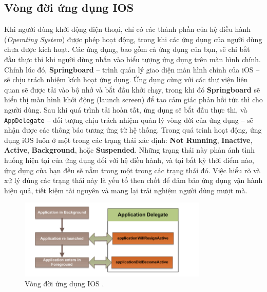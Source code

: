        
        \vspace{0.5em}
   \subsection{ Vòng đời ứng dụng IOS}	
        
            Khi người dùng khởi động điện thoại, chỉ có các thành phần của hệ điều hành (\textit{Operating System}) được phép hoạt động, trong khi các ứng dụng của người dùng chưa được kích hoạt. Các ứng dụng, bao gồm cả ứng dụng của bạn, sẽ chỉ bắt đầu thực thi khi người dùng nhấn vào biểu tượng ứng dụng trên màn hình chính. Chính lúc đó, \textbf{Springboard} – trình quản lý giao diện màn hình chính của iOS – sẽ chịu trách nhiệm kích hoạt ứng dụng. Ứng dụng cùng với các thư viện liên quan sẽ được tải vào bộ nhớ và bắt đầu khởi chạy, trong khi đó \textbf{Springboard} sẽ hiển thị màn hình khởi động (launch screen) để tạo cảm giác phản hồi tức thì cho người dùng. Sau khi quá trình tải hoàn tất, ứng dụng sẽ bắt đầu thực thi, và \texttt{AppDelegate} – đối tượng chịu trách nhiệm quản lý vòng đời của ứng dụng 
            – sẽ nhận được các thông báo tương ứng từ hệ thống.
            Trong quá trình hoạt động, ứng dụng iOS luôn ở một trong các trạng thái xác định: \textbf{Not Running}, \textbf{Inactive}, \textbf{Active}, \textbf{Background}, hoặc \textbf{Suspended}. Những trạng thái này phản ánh tình huống hiện tại của ứng dụng đối với hệ điều hành, và tại bất kỳ thời điểm nào, ứng dụng của bạn đều sẽ nằm trong một trong các trạng thái đó. Việc hiểu rõ và xử lý đúng các trạng thái này là yếu tố then chốt để đảm bảo ứng dụng vận hành hiệu quả, tiết kiệm tài nguyên và mang lại trải nghiệm người dùng mượt mà.

        \begin{figure}[H] %
            \centering
            \includegraphics[width=0.8\textwidth]{images/vongdoiios.png}
             \caption{Vòng đời ứng dụng IOS \cite{life cycle-IOS}.} 
            \label{fig:vongdoiios}
        \end{figure}
         
